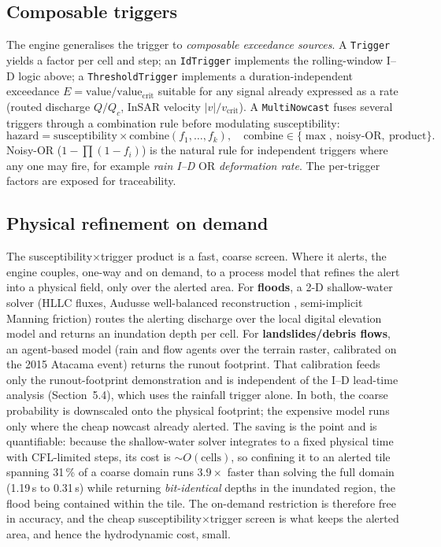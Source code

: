 \documentclass[authoryear,preprint,review,12pt]{elsarticle}
\begin{document}
\subsection{Composable triggers}

The engine generalises the trigger to \emph{composable exceedance sources}. A
\texttt{Trigger} yields a factor per cell and step; an \texttt{IdTrigger}
implements the rolling-window I--D logic above; a \texttt{ThresholdTrigger}
implements a duration-independent exceedance $E=\mathrm{value}/\mathrm{value_{crit}}$
suitable for any signal already expressed as a rate (routed discharge $Q/Q_c$,
InSAR velocity $|v|/v_{\mathrm{crit}}$). A \texttt{MultiNowcast} fuses several
triggers through a combination rule before modulating susceptibility:
\begin{equation}
\mathrm{hazard}=\mathrm{susceptibility}\times\mathrm{combine}(f_1,\ldots,f_k),
\quad\mathrm{combine}\in\{\max,\ \mathrm{noisy\text{-}OR},\ \mathrm{product}\}.
\label{eq:multi}
\end{equation}
Noisy-OR ($1-\prod(1-f_i)$) is the natural rule for independent triggers where
any one may fire, for example \emph{rain I--D} OR \emph{deformation rate}. The
per-trigger factors are exposed for traceability.

\subsection{Physical refinement on demand}

The susceptibility$\times$trigger product is a fast, coarse screen. Where it
alerts, the engine couples, one-way and on demand, to a process model that
refines the alert into a physical field, only over the alerted area. For
\textbf{floods}, a 2-D shallow-water solver (HLLC fluxes, Audusse well-balanced
reconstruction \citep{audusse2004}, semi-implicit Manning friction) routes the
alerting discharge over the local digital elevation model and returns an
inundation depth per cell. For \textbf{landslides/debris flows}, an agent-based
model (rain and flow agents over the terrain raster, calibrated on the 2015
Atacama event) returns the runout footprint. That calibration feeds only the
runout-footprint demonstration and is independent of the I--D lead-time analysis
(Section~5.4), which uses the rainfall trigger alone. In both, the coarse probability is
downscaled onto the physical footprint; the expensive model runs only where the
cheap nowcast already alerted. The saving is the point and is quantifiable:
because the shallow-water solver integrates to a fixed physical time with
CFL-limited steps, its cost is ${\sim}O(\mathrm{cells})$, so confining it to an
alerted tile spanning 31\,\% of a coarse domain runs $3.9\times$ faster than
solving the full domain (1.19\,s to 0.31\,s) while returning \emph{bit-identical}
depths in the inundated region, the flood being contained within the tile. The
on-demand restriction is therefore free in accuracy, and the cheap
susceptibility$\times$trigger screen is what keeps the alerted area, and hence the
hydrodynamic cost, small.
\end{document}
